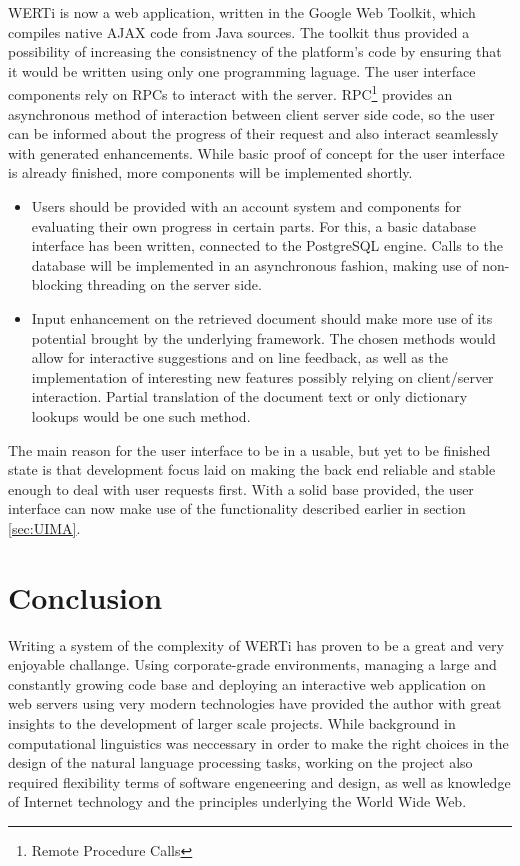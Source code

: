 \documentclass[12pt]{article}
\begin{document}
WERTi is now a web application, written in the Google Web Toolkit, which
compiles native AJAX code from Java sources. The toolkit thus provided a
possibility of increasing the consistnency of the platform's code by ensuring
that it would be written using only one programming laguage. The user interface
components rely on RPCs to interact with the server. RPC\footnote{Remote
Procedure Calls} provides an asynchronous method of interaction between client
server side code, so the user can be informed about the progress of their
request and also interact seamlessly with generated enhancements. While basic
proof of concept for the user interface is already finished, more components
will be implemented shortly.
\begin{itemize}
  \item Users should be provided with an account system and components for
    evaluating their own progress in certain parts. For this, a basic database
    interface has been written, connected to the PostgreSQL engine. Calls to the
    database will be implemented in an asynchronous fashion, making use of
    non-blocking threading on the server side.
  \item Input enhancement on the retrieved document should make more use of its
    potential brought by the underlying framework. The chosen methods would
    allow for interactive suggestions and on line feedback, as well as the
    implementation of interesting new features possibly relying on client/server
    interaction. Partial translation of the document text or only dictionary
    lookups would be one such method.
\end{itemize}

The main reason for the user interface to be in a usable, but yet to be finished
state is that development focus laid on making the back end reliable and stable
enough to deal with user requests first. With a solid base provided, the user
interface can now make use of the functionality described earlier in section
\ref{sec:UIMA}.

\section{Conclusion}

Writing a system of the complexity of WERTi has proven to be a great and very
enjoyable challange. Using corporate-grade environments, managing a large and
constantly growing code base and deploying an interactive web application on web
servers using very modern technologies have provided the author with great
insights to the development of larger scale projects. While background in
computational linguistics was neccessary in order to make the right choices in
the design of the natural language processing tasks, working on the project also
required flexibility terms of software engeneering and design, as well as
knowledge of Internet technology and the principles underlying the World Wide
Web.
\end{document}
